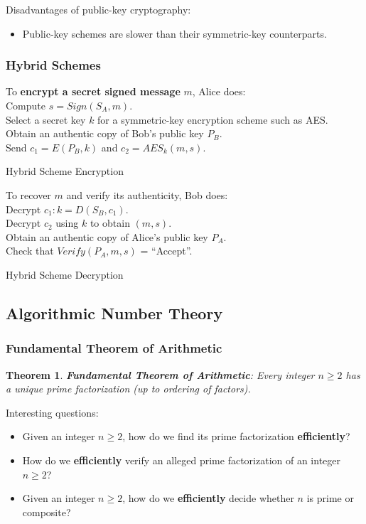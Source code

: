 \documentclass[12pt,titlepage]{article}
\newtheorem{prototheorem}{Theorem}[section]
\newenvironment{theorem}
{\colorlet{shadecolor}{orange!15}\begin{shaded}\begin{prototheorem}\normalfont}{\end{prototheorem}\end{shaded}}
\begin{document}
Disadvantages of public-key cryptography:\begin{itemize}
	\item Public-key schemes are slower than their symmetric-key counterparts.
\end{itemize}

\subsubsection{Hybrid Schemes}

\begin{algorithm}
	To \textbf{encrypt a secret signed message} $m$, Alice does:\\
	Compute $s = Sign(S_A , m)$.\\
	Select a secret key $k$ for a symmetric-key encryption scheme such as AES.\\
	Obtain an authentic copy of Bob’s public key $P_B$.\\
	Send $c_1 = E(P_B , k)$ and $c_2 = AES_k (m, s)$.
	\caption{Hybrid Scheme Encryption}
\end{algorithm}

\begin{algorithm}
	To recover $m$ and verify its authenticity, Bob does:\\
	Decrypt $c_1 : k = D(S_B , c_1)$.\\
	Decrypt $c_2$ using $k$ to obtain $(m, s)$.\\
	Obtain an authentic copy of Alice’s public key $P_A$.\\
	Check that $Verify(P_A , m, s)$ = ``Accept''.
	\caption{Hybrid Scheme Decryption}
\end{algorithm}

\subsection{Algorithmic Number Theory}
\subsubsection{Fundamental Theorem of Arithmetic}
\begin{theorem}
	\textbf{Fundamental Theorem of Arithmetic}: Every integer $n \geq 2$ has a unique prime factorization (up to ordering of factors).
\end{theorem}
Interesting questions:\begin{itemize}
	\item Given an integer $n \geq 2$, how do we find its prime factorization \textbf{efficiently}?
	\item How do we \textbf{efficiently} verify an alleged prime factorization of an integer $n \geq 2$?
	\item Given an integer $n \geq 2$, how do we \textbf{efficiently} decide whether $n$ is prime or composite?
\end{itemize}
\end{document}
